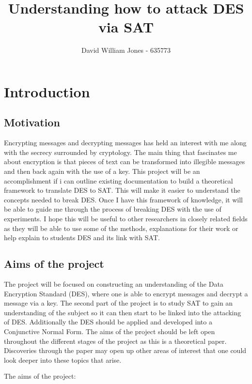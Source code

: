 \documentclass[11pt,a4paper]{report}
\author{David William Jones - 635773}
\begin{document}
\title{Understanding how to attack DES via SAT}
\maketitle
\tableofcontents

\chapter{Introduction}
\label{cha:Introduction}

\section{Motivation}
\label{cha:Motivation}
Encrypting messages and decrypting messages has held an interest with me along with the secrecy surrounded by cryptology. The main thing that fascinates me about encryption is that pieces of text can be transformed into illegible messages and then back again with the use of a key. This project will be an accomplishment if i can outline existing documentation to build a theoretical framework to translate DES to SAT. This will make it easier to understand the concepts needed to break DES. Once I have this framework of knowledge, it will be able to guide me through the process of breaking DES with the use of experiments. I hope this will be useful to other researchers in closely related fields as they will be able to use some of the methods, explanations for their work or help explain to students DES and its link with SAT. 

\section{Aims of the project}
\label{cha:Aims}
The project will be focused on constructing an understanding of the Data Encryption Standard (DES), where one is able to encrypt messages and decrypt a message via a key. The second part of the project is to study SAT to gain an understanding of the subject so it can then start to be linked into the attacking of DES. Additionally the DES should be applied and developed into a Conjunctive Normal Form.
The aims of the project should be left open throughout the different stages of the project as this is a theoretical paper. Discoveries through the paper may open up other areas of interest that one could look deeper into these topics that arise.\newline

\noindent The aims of the project:
\end{document}
